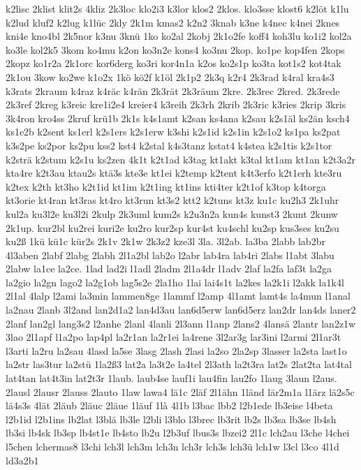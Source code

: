 {k2lisc
2klist
klit2s
4kliz
2k3loc
klo2i3
k3lor
klos2
2klos.
klo3sse
klost6
k2löt
k1lu
k2lud
kluf2
k2lug
k1lüc
2kly
2k1m
kmas2
k2n2
3knab
k3ne
k4nec
k4nei
2knes
kni4e
kno4bl
2k5nor
k3nu
3knü
1ko
ko2al
2kobj
2k1o2fe
koff4
koh3lu
ko1i2
kol2a
ko3le
kol2k5
3kom
ko4mu
k2on
ko3n2e
kons4
ko3nu
2kop.
ko1pe
kop4fen
2kops
2kopz
ko1r2a
2k1orc
kor6derg
ko3ri
kor4n1a
k2os
ko2s1p
ko3ta
kot1s2
kot4tak
2k1ou
3kow
ko2we
k1o2x
1kö
kö2f
k1öl
2k1p2
2k3q
k2r4
2k3rad
k4ral
kra4s3
k3rats
2kraum
k4raz
k4räc
k4rän
2k3rät
2k3räum
2kre.
2k3rec
2kred.
2k3rede
2k3ref
2kreg
k3reic
kre1i2e4
kreier4
k3reih
2k3rh
2krib
2k3ric
k3ries
2krip
3kris
3k4ron
kro4ss
2kruf
krü1b
2k1s
k4s1amt
k2san
ks4ana
k2sau
k2s1äl
ks2än
ksch4
ks1e2b
k2sent
ks1erl
k2s1ers
k2s1erw
k3shi
k2s1id
k2s1in
k2s1o2
ks1pa
ks2pat
k3s2pe
ks2por
ks2pu
kss2
kst4
k2stal
k4s3tanz
kstat4
k4stea
k2s1tis
k2s1tor
k2strä
k2stum
k2s1u
ks2zen
4k1t
k2t1ad
k3tag
kt1akt
k3tal
kt1am
kt1an
k2t3a2r
kta4re
k2t3au
ktau2s
ktä3s
kte3e
kt1ei
k2temp
k2tent
k4t3erfo
k2t1erh
kte3ru
k2tex
k2th
kt3ho
k2t1id
kt1im
k2t1ing
kt1ins
kti4ter
k2t1of
k3top
k4torga
kt3orie
kt4ran
kt3ras
kt4ro
kt3run
kt3s2
ktt2
k2tuns
kt3z
ku1c
ku2h3
2k1uhr
kul2a
ku3l2e
ku3l2i
2kulp
2k3uml
kum2s
k2u3n2a
kun4s
kunst3
2kunt
2kunw
2k1up.
kur2bl
ku2rei
kuri2e
ku2ro
kur2sp
kur4st
ku4schl
ku2sp
kus3ses
ku2su
ku2ß
1kü
kü1c
kür2s
2k1v
2k1w
2k3z2
kze3l
3la.
3l2ab.
la3ba
2labb
lab2br
4l3aben
2labf
2labg
2labh
2l1a2bl
lab2o
l2abr
lab4ra
lab4ri
2labs
l1abt
3labu
2labw
la1ce
la2ce.
1lad
lad2i
l1adl
2ladm
2l1a4dr
l1adv
2laf
la2fa
laf3t
la2ga
la2gio
la2gn
lago2
la2g1ob
lag5s2e
2la1ho
1lai
lai4s1t
la2kes
la2k1i
l2akk
la1k4l
2l1al
4lalp
l2ami
la3min
lammen8ge
1lammf
l2amp
4l1amt
lamt4s
la4mun
l1anal
la2nau
2lanb
3l2and
lan2d1a2
lan4d3au
lan6d5erw
lan6d5erz
lan2dr
lan4ds
laner2
2lanf
lan2gl
lang3s2
l2anhe
2lanl
4lanli
2l3ann
l1anp
2lans2
4lansä
2lantr
lan2z1w
3lao
2l1apf
l1a2po
lap4pl
la2r1an
la2r1ei
la4rene
3l2ar3g
lar3ini
l2armi
2l1ar3t
l3arti
la2ru
la2sau
4lasd
la5se
3lasg
2lash
2lasi
la2so
2la2sp
3lasser
la2sta
last1o
la2str
las3tur
la2stü
1la2ß3
lat2a
la3t2e
la4tel
2l3ath
la2t3ra
lat2s
2lat2ta
lat4tal
lat4tan
lat4t3in
lat2t3r
1laub.
laub4se
lauf1i
lau4fin
lau2fo
1laug
3laun
l2aus.
2lausl
2lausr
2lauss
2lauto
1law
lawa4
lä1c
2läf
2l1ähn
1länd
lär2m1a
l1ärz
lä2s5c
lä4s3s
4lät
2läub
2läuc
2läue
1läuf
1là
4l1b
l3bac
lbb2
l2b1ede
lb3eise
l4beta
l2b1id
l2b1ins
lb2lat
l3blä
lb3le
l2bli
l3blo
l3brec
lb3rit
lb2s
lb3sa
lb3se
lb4sh
lb3si
lb4sk
lb3sp
lb4st1e
lb4sto
lb2u
l2b3uf
lbus3s
lbzei2
2l1c
lch2au
l3che
l4chei
l5chen
lchermas8
l3chi
lch3l
lch3m
lch3n
lch3r
lch3s
lch3ü
lch1w
l3cl
l3co
4l1d
ld3a2b1
}
